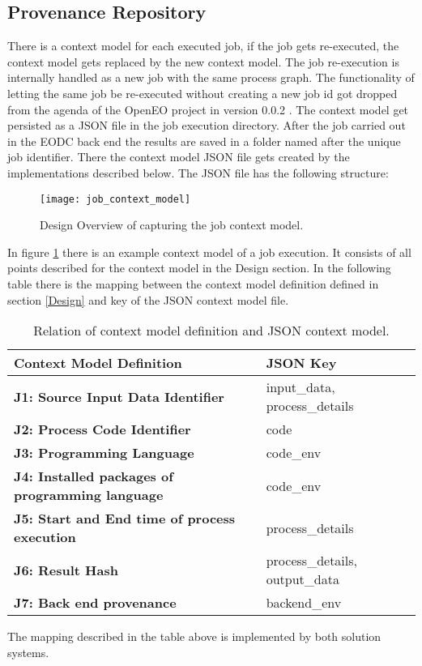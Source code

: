 \documentclass[draft,final]{vutinfth} %
\begin{document}
\subsection{Provenance Repository}\label{Implementation:Provenance Repository}
There is a context model for each executed job, if the job gets re-executed, the context model gets replaced by the new context model. The job re-execution is internally handled as a new job with the same process graph. The functionality of letting the same job be re-executed without creating a new job id got dropped from the agenda of the OpenEO project in version 0.0.2 \cite{openeo}. 
The context model get persisted as a JSON file in the job execution directory. After the job carried out in the EODC back end the results are saved in a folder named after the unique job identifier. There the context model JSON file gets created by the implementations described below. The JSON file has the following structure:

\begin{figure}[h]
	\centering
	\texttt{[image: job\_context\_model]}
	\caption{Design Overview of capturing the job context model.}
	\label{fig:job_context_model} %
\end{figure}

In figure \ref{fig:job_context_model} there is an example context model of a job execution. It consists of all points described for the context model in the Design section. In the following table there is the mapping between the context model definition defined in section \ref{Design} and key of the JSON context model file. 

\begin{table}[]
	\caption{Relation of context model definition and JSON context model.}
	\begin{tabular}{l|l}
		\textbf{Context Model Definition} & \textbf{JSON Key} \\ \hline
		\textbf{J1:  Source Input Data Identifier} & input\_data, process\_details \\ \hline
		\textbf{J2: Process Code Identifier} & code \\ \hline
		\textbf{J3: Programming Language} & code\_env \\ \hline
		\textbf{J4: Installed packages of programming language} & code\_env \\ \hline
		\textbf{J5: Start and End time of process execution} & process\_details \\ \hline
		\textbf{J6: Result Hash} & process\_details, output\_data \\ \hline
		\textbf{J7: Back end provenance} & backend\_env \\ 
	\end{tabular}
\label{Tab:contextmodel}
\end{table}
The mapping described in the table above is implemented by both solution systems. 
\end{document}
